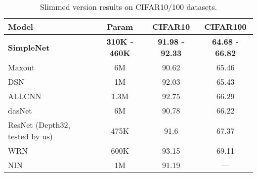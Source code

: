 \documentclass{article} \usepackage{lets_keepit_simple,times}
\begin{document}
\begin{table}[H]
	\begin{center}
\caption{Slimmed version results on CIFAR10/100 datasets.}\label{tab:Slimmed}
		\begin{tabular}{lccc}
Model & Param & CIFAR10 &CIFAR100 \\ \hline
\textbf{SimpleNet} & \textbf{310K - 460K} &\textbf{91.98 - 92.33}& \textbf{64.68 - 66.82} \\
Maxout \cite{Goodfellow_MaxoutNetwork_2013} & 6M & 90.62 & 65.46 \\
DSN \cite{Lee_DeeplySupervisedNet_2015} & 1M &  92.03 & 65.43 \\
ALLCNN \cite{Springenberg_StrivingForSimplicity_2014} & 1.3M& 92.75& 66.29 \\
dasNet \cite{stollenga_dasnet_2014} & 6M & 90.78 & 66.22 \\
ResNet \cite{He_ResNet_2015} {\tiny(Depth32, tested by us)} & 475K &  91.6 & 67.37 \\
WRN \cite{Zagoruyko_WRN_2016}  & 600K &  93.15 & 69.11 \\
NIN \cite{Lin_NIN_2013}  & 1M	&91.19 &---\\ \hline
\end{tabular}
	\end{center}
	
\end{table}
\end{document}
